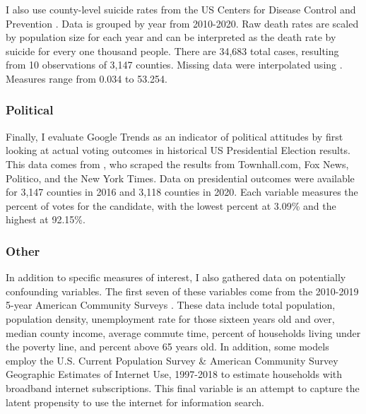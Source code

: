 I also use county-level suicide rates from the US Centers for Disease Control
and Prevention \citeyearpar{suic_data}. Data is grouped by year from 2010-2020.
Raw death rates are scaled by population size for each year and can be
interpreted as the death rate by suicide for every one thousand people. There
are 34,683 total cases, resulting from 10 observations of 3,147 counties.
Missing data were interpolated using \citet{zoo}. Measures range from 0.034 to
53.254.

\subsubsection{Political}

Finally, I evaluate Google Trends as an indicator of political attitudes by
first looking at actual voting outcomes in historical US Presidential Election
results. This data comes from  \citet{pres_data}, who scraped the results from
Townhall.com, Fox News, Politico, and the New York Times. Data on presidential
outcomes were available for 3,147 counties in 2016 and 3,118 counties in 2020.
Each variable measures the percent of votes for the candidate, with the lowest
percent at 3.09\% and the highest at 92.15\%.



\subsubsection{Other}

In addition to specific measures of interest, I also gathered data on
potentially confounding variables. The first seven of these variables come from
the 2010-2019 5-year American Community Surveys \citep{acs2019, acs2018,
acs2017, acs2016, acs2015, acs2014, acs2013, acs2012, acs2011, acs2010}. These
data include total population, population density, unemployment rate for those
sixteen years old and over, median county income, average commute time, percent
of households living under the poverty line, and percent above 65 years old. In
addition, some models employ the U.S. Current Population Survey \& American
Community Survey Geographic Estimates of Internet Use, 1997-2018
\citep{internet_use} to estimate households with broadband internet
subscriptions. This final variable is an attempt to capture the latent
propensity to use the internet for information search.

